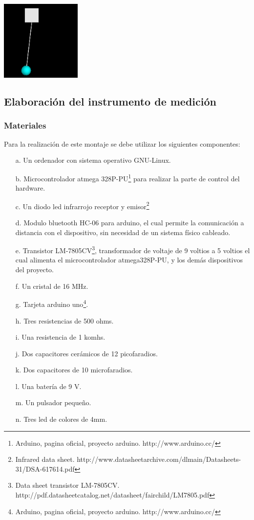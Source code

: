 \documentclass[12pt]{article}
\newenvironment{Figure}
{\par\medskip\noindent\minipage{\linewidth}}
{\endminipage\par\medskip}
\begin{document}
\begin{multicols}{2}
\begin{Figure}
\center
\includegraphics[width=4.0cm, height=4cm] {fig/fig1.png}
\label{fig:g1}
\end{Figure}

\subsection{Elaboración del instrumento de medición}

\subsubsection{Materiales}
Para la realización de este montaje se debe utilizar los siguientes componentes:
\begin{enumerate}
\item[a.] Un ordenador con sistema operativo GNU-Linux.
\item[b.] Microcontrolador atmega 328P-PU\footnote{ Arduino, pagina oficial, proyecto arduino. http://www.arduino.cc/} para realizar la parte de control del hardware.
\item[c.] Un diodo led infrarrojo receptor y emisor\footnote{ Infrared data sheet.  http://www.datasheetarchive.com/dlmain/Datasheets-31/DSA-617614.pdf}
\item[d.] Modulo bluetooth HC-06 para arduino, el cual permite la comunicación a distancia con el dispositivo, sin necesidad de un sistema físico cableado.
\item[e.] Transistor LM-7805CV\footnote{ Data sheet transistor LM-7805CV. http://pdf.datasheetcatalog.net/datasheet/fairchild/LM7805.pdf}, transformador de voltaje de 9 voltios a 5 voltios el cual alimenta el microcontrolador atmega328P-PU, y los demás dispositivos del proyecto.
\item[f.] Un cristal de 16 MHz.
\item[g.] Tarjeta arduino uno\footnote{ Arduino, pagina oficial, proyecto arduino. http://www.arduino.cc/}.
\item[h.] Tres resistencias de 500 ohms.
\item[i.] Una resistencia de 1 komhs.
\item[j.] Dos capacitores cerámicos de 12 picofaradios.
\item[k.] Dos capacitores de 10 microfaradios.
\item[l.] Una batería de 9 V.
\item[m.] Un pulsador pequeño.
\item[n.] Tres led de colores de 4mm. 
\end{enumerate}


\end{multicols}
\end{document}
